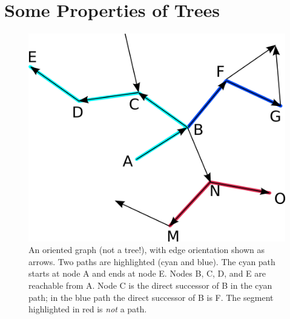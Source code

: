 \chapter{Some Properties of Trees}
\label{sct_defining_clades}

\begin{figure}[t]
\centering
\includegraphics{oriented_graph.png}
 \caption{An oriented graph (not a tree!), with edge orientation shown as arrows. Two paths are highlighted (cyan and blue). The cyan path starts at node A and ends at node E. Nodes B, C, D, and E are reachable from A. Node C is the direct successor of B in the cyan path; in the blue path the direct successor of B is F. The segment highlighted in red is \emph{not} a path.}
 \label{fig_oriented_graph}
\end{figure}



